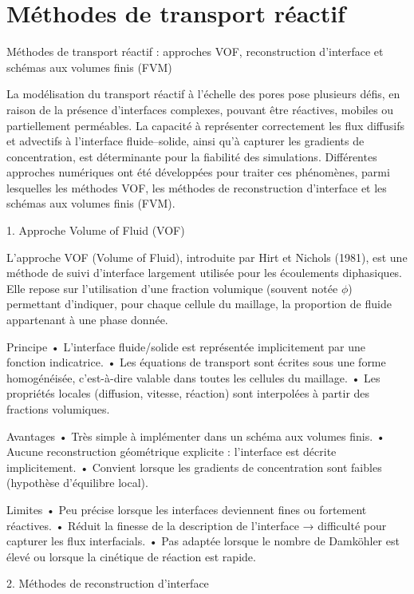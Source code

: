 \documentclass[12pt,a4paper]{report}
\begin{document}
\section{Méthodes de transport réactif}
Méthodes de transport réactif : approches VOF, reconstruction d’interface et schémas aux volumes finis (FVM)

La modélisation du transport réactif à l’échelle des pores pose plusieurs défis, en raison de la présence d’interfaces complexes, pouvant être réactives, mobiles ou partiellement perméables. La capacité à représenter correctement les flux diffusifs et advectifs à l’interface fluide–solide, ainsi qu’à capturer les gradients de concentration, est déterminante pour la fiabilité des simulations. Différentes approches numériques ont été développées pour traiter ces phénomènes, parmi lesquelles les méthodes VOF, les méthodes de reconstruction d’interface et les schémas aux volumes finis (FVM).



1. Approche Volume of Fluid (VOF)

L’approche VOF (Volume of Fluid), introduite par Hirt et Nichols (1981), est une méthode de suivi d’interface largement utilisée pour les écoulements diphasiques. Elle repose sur l’utilisation d’une fraction volumique (souvent notée $\phi$) permettant d’indiquer, pour chaque cellule du maillage, la proportion de fluide appartenant à une phase donnée.

Principe
	•	L’interface fluide/solide est représentée implicitement par une fonction indicatrice.
	•	Les équations de transport sont écrites sous une forme homogénéisée, c’est-à-dire valable dans toutes les cellules du maillage.
	•	Les propriétés locales (diffusion, vitesse, réaction) sont interpolées à partir des fractions volumiques.

Avantages
	•	Très simple à implémenter dans un schéma aux volumes finis.
	•	Aucune reconstruction géométrique explicite : l’interface est décrite implicitement.
	•	Convient lorsque les gradients de concentration sont faibles (hypothèse d’équilibre local).

Limites
	•	Peu précise lorsque les interfaces deviennent fines ou fortement réactives.
	•	Réduit la finesse de la description de l’interface → difficulté pour capturer les flux interfacials.
	•	Pas adaptée lorsque le nombre de Damköhler est élevé ou lorsque la cinétique de réaction est rapide.



2. Méthodes de reconstruction d’interface
\end{document}
